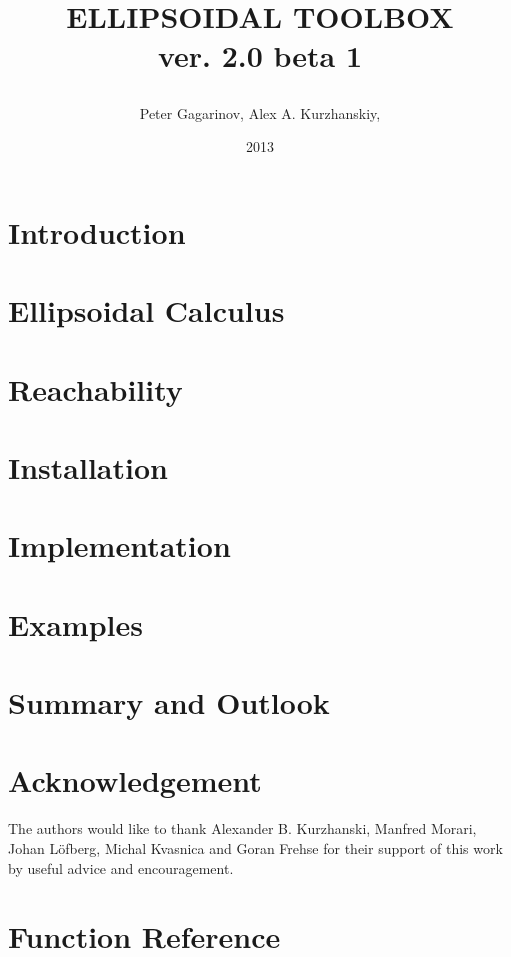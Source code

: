 \documentclass{report}
\title{
\easyfigure[ht][0.7\textwidth]{pic/logo.eps}{}{}
ELLIPSOIDAL TOOLBOX%
\\
\normalsize{ver. 2.0 beta 1}
\author{Peter Gagarinov, Alex A. Kurzhanskiy,}
\date{2013}
}
\begin{document}
\maketitle
\tableofcontents

\chapter{Introduction}\label{ch_intro}


\chapter{Ellipsoidal Calculus}\label{ch_ellcalc}


\chapter{Reachability}\label{ch_reachability}


\chapter{Installation}\label{ch_install}


\chapter{Implementation}\label{ch_implementation}


\chapter{Examples}\label{ch_examples}


\chapter{Summary and Outlook}\label{ch_summary}


\chapter*{Acknowledgement}
The authors would like to thank Alexander B. Kurzhanski,
Manfred Morari, Johan L{\"o}fberg, Michal Kvasnica and Goran Frehse
for their support of this work by useful advice and encouragement.



\appendix
\chapter{Function Reference}\label{appendix_a}

\end{document}

